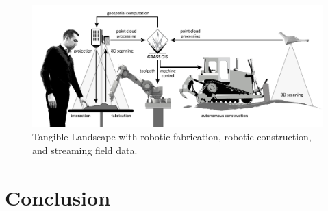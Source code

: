 \documentclass[prodmode,acmtochi]{acmsmall} %
\begin{document}
\begin{figure}
\begin{center}
\includegraphics[width=\textwidth]{images/system_schema_land.pdf}
\caption{Tangible Landscape with 
robotic fabrication, robotic construction, and streaming field data.}
\label{fig:system_schema_land}
\end{center}
\end{figure}

\section{Conclusion}

% 
%


\end{document}
